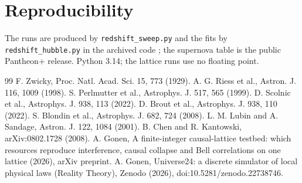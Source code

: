 \documentclass[11pt]{article}
\begin{document}
\section*{Reproducibility}
The runs are produced by \texttt{redshift\_sweep.py} and the fits by
\texttt{redshift\_hubble.py} in the archived code \cite{zenodo}; the
supernova table is the public Pantheon+ release. Python 3.14; the lattice
runs use no floating point.

\begin{thebibliography}{99}
 F. Zwicky, Proc. Natl. Acad. Sci. 15, 773 (1929).
 A. G. Riess et al., Astron. J. 116, 1009 (1998).
 S. Perlmutter et al., Astrophys. J. 517, 565 (1999).
 D. Scolnic et al., Astrophys. J. 938, 113 (2022).
 D. Brout et al., Astrophys. J. 938, 110 (2022).
 S. Blondin et al., Astrophys. J. 682, 724 (2008).
 L. M. Lubin and A. Sandage, Astron. J. 122, 1084 (2001).
 B. Chen and R. Kantowski, arXiv:0802.1728 (2008).
 A. Gonen, A finite-integer causal-lattice testbed: which resources reproduce interference, causal collapse and Bell correlations on one lattice (2026), arXiv preprint.
 A. Gonen, Universe24: a discrete simulator of local physical laws (Reality Theory), Zenodo (2026), doi:10.5281/zenodo.22738746.
\end{thebibliography}
\end{document}
